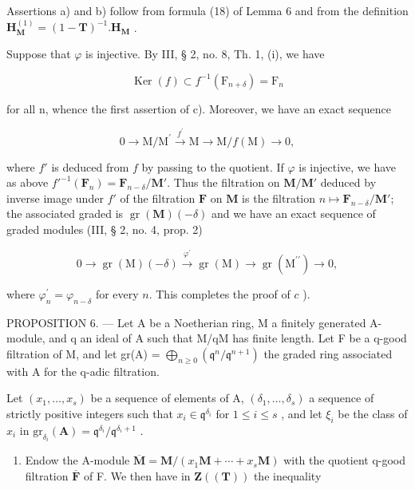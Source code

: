Assertions a) and b) follow from formula (18) of Lemma 6 and from the definition \(\mathbf{H}_{\mathbf{M}}^{(1)} = (1 - \mathbf{T})^{-1}.\mathbf{H}_{\mathbf{M}}\) .

Suppose that \(\varphi\) is injective. By III, § 2, no. 8, Th. 1, (i), we have

\[
\operatorname{Ker} (f) \subset f ^ {- 1} (\mathrm{F} _ {n + \delta}) = \mathrm{F} _ {n}
\]

for all n, whence the first assertion of c). Moreover, we have an exact sequence

\[
0 \longrightarrow \mathrm{M} / \mathrm{M} ^ {\prime} \stackrel {f ^ {\prime}} {\longrightarrow} \mathrm{M} \longrightarrow \mathrm{M} / f (\mathrm{M}) \longrightarrow 0,
\]

where \(f'\) is deduced from \(f\) by passing to the quotient. If \(\varphi\) is injective, we have as above \(f'^{-1}(\mathbf{F}_n) = \mathbf{F}_{n-\delta}/\mathbf{M}'\). Thus the filtration on \(\mathbf{M}/\mathbf{M}'\) deduced by inverse image under \(f'\) of the filtration \(\mathbf{F}\) on \(\mathbf{M}\) is the filtration \(n \mapsto \mathbf{F}_{n-\delta}/\mathbf{M}'\); the associated graded is \(\operatorname{gr}(\mathbf{M})(-\delta)\) and we have an exact sequence of graded modules (III, § 2, no. 4, prop. 2)

\[
0 \longrightarrow \operatorname{gr} (\mathrm{M}) (- \delta) \xrightarrow {\varphi^ {\prime}} \operatorname{gr} (\mathrm{M}) \longrightarrow \operatorname{gr} \left(\mathrm{M} ^ {\prime \prime}\right) \longrightarrow 0,
\]

where \(\varphi_{n}^{\prime} = \varphi_{n - \delta}\) for every \(n\). This completes the proof of \(c\) ).

PROPOSITION 6. — Let A be a Noetherian ring, M a finitely generated A-module, and q an ideal of A such that M/qM has finite length. Let F be a q-good filtration of M, and let gr(A) = \(\bigoplus_{n\geqslant 0}(\mathfrak{q}^n /\mathfrak{q}^{n + 1})\) the graded ring associated with A for the q-adic filtration.

Let \((x_{1},\ldots,x_{s})\) be a sequence of elements of A, \((\delta_{1},\ldots,\delta_{s})\) a sequence of strictly positive integers such that \(x_{i}\in\mathfrak{q}^{\delta_{i}}\) for \(1\leqslant i\leqslant s\) , and let \(\xi_{i}\) be the class of \(x_{i}\) in \(\mathrm{gr}_{\delta_{i}}(\mathbf{A})=\mathfrak{q}^{\delta_{i}}/\mathfrak{q}^{\delta_{i}+1}\) .

\begin{enumerate}
\def\labelenumi{\alph{enumi})}
\tightlist
\item
  Endow the A-module \(\overline{\mathbf{M}} = \mathbf{M}/(x_1\mathbf{M} + \cdots + x_s\mathbf{M})\) with the quotient q-good filtration \(\overline{\mathbf{F}}\) of F. We then have in \(\mathbf{Z}((\mathbf{T}))\) the inequality
\end{enumerate}

